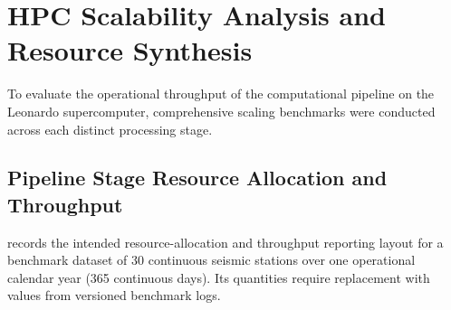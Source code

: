 \section{\acs{HPC} Scalability Analysis and Resource Synthesis}
\label{sec:scalability}

To evaluate the operational throughput of the computational pipeline
on the Leonardo supercomputer, comprehensive scaling benchmarks were
conducted across each distinct processing stage.

\subsection{Pipeline Stage Resource Allocation and Throughput}
 records the intended
resource-allocation and throughput reporting layout for a benchmark
dataset of \num{30} continuous seismic stations over one operational
calendar year (\num{365} continuous days). Its quantities require
replacement with values from versioned benchmark logs.

